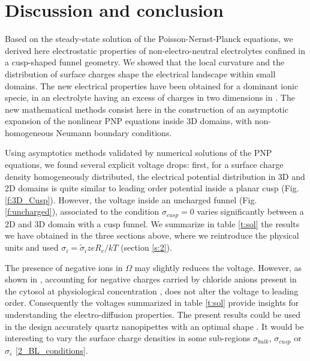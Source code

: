 \documentclass[12pt]{article}
\newcommand{\p}{\partial}
\newcommand{\eps}{\varepsilon}
\begin{document}
{\section{Discussion and conclusion}
Based on the steady-state solution of the Poisson-Nernst-Planck equations, we derived here electrostatic properties of non-electro-neutral electrolytes confined in a cusp-shaped funnel geometry. We showed that the local curvature and the distribution of surface charges shape the electrical landscape within small domains. The new electrical properties have been obtained for a dominant ionic specie, in an electrolyte having an excess of charges in two dimensions in \cite{NonLin2017}. The new mathematical methods consist here in the construction of an asymptotic expansion of the nonlinear PNP equations inside 3D domains, with non-homogeneous Neumann boundary conditions.

Using asymptotics methods validated by numerical solutions of the PNP equations, we found several explicit voltage drops: first, for a surface charge density homogeneously distributed, the electrical potential distribution in 3D and 2D domains is quite similar to leading order potential inside a planar cusp (Fig. \ref{f:3D_Cusp}). However, the voltage inside an uncharged funnel (Fig. \ref{f:uncharged}), associated to the condition $\sigma_{cusp}=0$ varies significantly between a 2D and 3D domain with a cusp funnel.
We summarize in table \ref{t:sol} the results we have obtained in the three sections above, where we reintroduce the physical units and used $\sigma_i=\tilde \sigma_i z e R_c/kT$ (section \ref{s:2}).

The presence of negative ions in $\Omega$ may slightly reduces the voltage. However, as shown in \cite{NonLin2017}, accounting for negative charges carried by chloride anions present in the cytosol at physiological concentration \cite{Hille}, does not alter the voltage to leading order. Consequently the voltages summarized in table \ref{t:sol} provide insights for understanding the electro-diffusion properties. The present results could be used in the design accurately quartz nanopipettes with an optimal shape \cite{HS2012,Perry,Jayant}. It would be interesting to vary the surface charge densities \cite{Sparreboom} in some sub-regions $\sigma_{bulk}$, $\sigma_{cusp}$ or $\sigma_{ \eps}$ \eqref{2_BL_conditions}.

}
\end{document}
